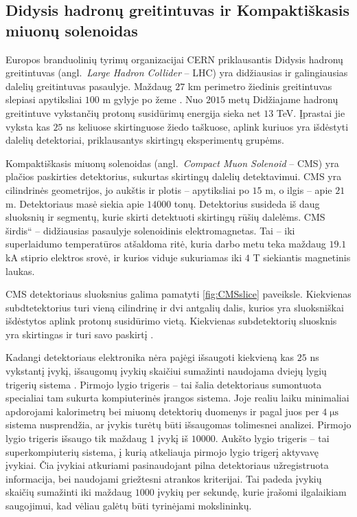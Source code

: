 \documentclass[a4paper, 12pt, twoside]{article}
\newcommand{\ltq}[1]{{\quotedblbase{}#1\textquotedblleft{}}}
\newlength\q
\begin{document}
\subsection{Didysis hadronų greitintuvas ir Kompaktiškasis miuonų solenoidas}

Europos branduolinių tyrimų organizacijai CERN priklausantis Didysis hadronų greitintuvas
(angl.\ \textit{Large Hadron Collider} -- LHC) yra didžiausias ir galingiausias dalelių greitintuvas pasaulyje.
Maždaug $27$ km perimetro žiedinis greitintuvas slepiasi apytiksliai $100$ m gylyje po žeme \cite{LHC}.
Nuo $2015$ metų Didžiajame hadronų greitintuve vykstančių protonų susidūrimų energija sieka net $13$ TeV.
Įprastai jie vyksta kas $25$ ns keliuose skirtinguose žiedo taškuose, aplink kuriuos yra išdėstyti dalelių
detektoriai, priklausantys skirtingų eksperimentų grupėms.

Kompaktiškasis miuonų solenoidas (angl.\ \textit{Compact Muon Solenoid} -- CMS) yra plačios paskirties
detektorius, sukurtas skirtingų dalelių detektavimui.
CMS yra cilindrinės geometrijos, jo aukštis ir plotis -- apytiksliai po $15$ m, o ilgis --
apie $21$ m.
Detektoriaus masė siekia apie $14000$ tonų.
Detektorius susideda iš daug sluoksnių ir segmentų, kurie skirti detektuoti skirtingų rūšių dalelėms.
CMS \ltq{širdis} -- didžiausias pasaulyje solenoidinis elektromagnetas.
Tai -- iki superlaidumo temperatūros atšaldoma ritė, kuria darbo metu teka maždaug $19.1$ kA stiprio
elektros srovė, ir kurios viduje sukuriamas iki $4$ T siekiantis magnetinis laukas.

CMS detektoriaus sluoksnius galima pamatyti \ref{fig:CMSslice} paveiksle.
Kiekvienas subdtetektorius turi vieną cilindrinę ir dvi antgalių dalis, kurios yra sluoksniškai išdėstytos
aplink protonų susidūrimo vietą.
Kiekvienas subdetektorių sluosknis yra skirtingas ir turi savo paskirtį \cite{CMSexperiment}.

Kadangi detektoriaus elektronika nėra pajėgi išsaugoti kiekvieną kas $25$ ns vykstantį įvykį, išsaugomų
įvykių skaičiui sumažinti naudojama dviejų lygių trigerių sistema \cite{CMStrig}.
Pirmojo lygio trigeris -- tai šalia detektoriaus sumontuota specialiai tam sukurta kompiuterinės
įrangos sistema.
Joje realiu laiku minimaliai apdorojami kalorimetrų bei miuonų detektorių duomenys ir pagal juos per
$4 \; \mathrm{\mu s}$ sistema nusprendžia, ar įvykis turėtų būti išsaugomas tolimesnei analizei. 
Pirmojo lygio trigeris išsaugo tik maždaug $1$ įvykį iš $10000$.
Aukšto lygio trigeris -- tai superkompiuterių sistema, į kurią atkeliauja pirmojo lygio trigerį
aktyvavę įvykiai.
Čia įvykiai atkuriami pasinaudojant pilna detektoriaus užregistruota informacija, bei naudojami
griežtesni atrankos kriterijai.
Tai padeda įvykių skaičių sumažinti iki maždaug $1000$ įvykių per sekundę, kurie įrašomi ilgalaikiam saugojimui,
kad vėliau galėtų būti tyrinėjami mokslininkų.
\end{document}
